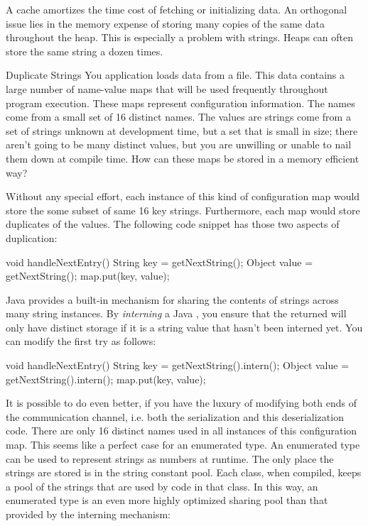 A cache amortizes the time cost of fetching or initializing data. An orthogonal
issue lies in the memory expense of storing many copies of the same data
throughout the heap. This is especially a problem with strings. Heaps can often
store the same string a dozen times.

\begin{example}{Duplicate Strings}
You application loads data from a file. This data contains a large number of
name-value maps that will be used frequently throughout program execution.
These maps represent configuration information. The names come from a small set
of 16 distinct names. The values are strings come from
a set of strings unknown at development time, but a set that is small in size;
there aren't going to be many distinct values, but you are unwilling or unable
to nail them down at compile time. How can these maps be stored in a memory
efficient way?
\end{example}

Without any special effort, each instance of this kind of configuration map
would store the some subset of same 16 key strings. Furthermore, each map would
store duplicates of the values. The following code snippet has those two
aspects of duplication:

\begin{shortlisting}
void handleNextEntry() {
	String key = getNextString();
	Object value = getNextString();
	map.put(key, value);
}
\end{shortlisting} 

Java provides a built-in mechanism for sharing the contents of strings across
many string instances. By \emph{interning} a Java
, you ensure that the returned  will only have
distinct storage if it is a string value that hasn't been interned yet. You can
modify the first try as follows:

\begin{shortlisting}
void handleNextEntry() {
	String key = getNextString().intern();
	Object value = getNextString().intern();
	map.put(key, value);
}
\end{shortlisting} 

It is possible to do even better, if you have the luxury of modifying both ends
of the communication channel, i.e. both the serialization and this
deserialization code. There are only 16 distinct names used in all instances of
this configuration map. This seems like a perfect case for an enumerated type.
An enumerated type can be used to represent strings as numbers at runtime. The
only place the strings are stored is in the string constant pool. Each class, when compiled, keeps a pool of the strings that
are used by code in that class. In this way, an enumerated type is an even more
highly optimized sharing pool than that provided by the interning mechanism:

